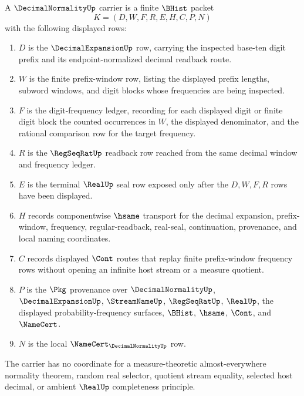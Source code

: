 \begin{definition}\label{def:decimal-normality-carrier}
A $\DecimalNormalityUp$ carrier is a finite $\BHist$ packet
$$
K=(D,W,F,R,E,H,C,P,N)
$$
with the following displayed rows:
\begin{enumerate}
\item $D$ is the $\DecimalExpansionUp$ row, carrying the inspected base-ten
digit prefix and its endpoint-normalized decimal readback route.
\item $W$ is the finite prefix-window row, listing the displayed prefix lengths,
subword windows, and digit blocks whose frequencies are being inspected.
\item $F$ is the digit-frequency ledger, recording for each displayed digit or
finite digit block the counted occurrences in $W$, the displayed denominator,
and the rational comparison row for the target frequency.
\item $R$ is the $\RegSeqRatUp$ readback row reached from the same decimal
window and frequency ledger.
\item $E$ is the terminal $\RealUp$ seal row exposed only after the
$D,W,F,R$ rows have been displayed.
\item $H$ records componentwise $\hsame$ transport for the decimal expansion,
prefix-window, frequency, regular-readback, real-seal, continuation,
provenance, and local naming coordinates.
\item $C$ records displayed $\Cont$ routes that replay finite prefix-window
frequency rows without opening an infinite host stream or a measure quotient.
\item $P$ is the $\Pkg$ provenance over $\DecimalNormalityUp$,
$\DecimalExpansionUp$, $\StreamNameUp$, $\RegSeqRatUp$, $\RealUp$, the displayed
probability-frequency surfaces, $\BHist$, $\hsame$, $\Cont$, and $\NameCert$.
\item $N$ is the local $\NameCert_{\DecimalNormalityUp}$ row.
\end{enumerate}
The carrier has no coordinate for a measure-theoretic almost-everywhere
normality theorem, random real selector, quotient stream equality, selected
host decimal, or ambient $\RealUp$ completeness principle.
\end{definition}

